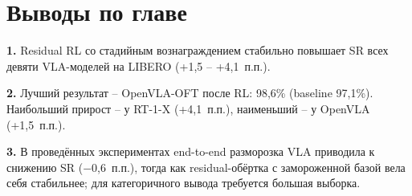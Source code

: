 \begin{table}[htbp]
\caption{Итоговое сравнение: SR (\%) на LIBERO, среднее по 4 наборам.}
\label{tab:full_comparison}
\centering
\footnotesize
\setlength{\tabcolsep}{4pt}
\renewcommand{\arraystretch}{1.15}
\end{table}

\section{Выводы по главе}
\label{sec:chap3_conclusions}

    \textbf{1.} Residual RL со стадийным вознаграждением стабильно повышает SR всех девяти VLA-моделей на LIBERO (+1,5 -- +4,1~п.п.).

    \textbf{2.} Лучший результат -- OpenVLA-OFT после RL: 98,6\% (baseline 97,1\%). Наибольший прирост -- у RT-1-X (+4,1~п.п.), наименьший -- у OpenVLA (+1,5~п.п.).

    \textbf{3.} В проведённых экспериментах end-to-end разморозка VLA приводила к снижению SR ($-$0,6~п.п.), тогда как residual-обёртка с замороженной базой вела себя стабильнее; для категоричного вывода требуется большая выборка.

